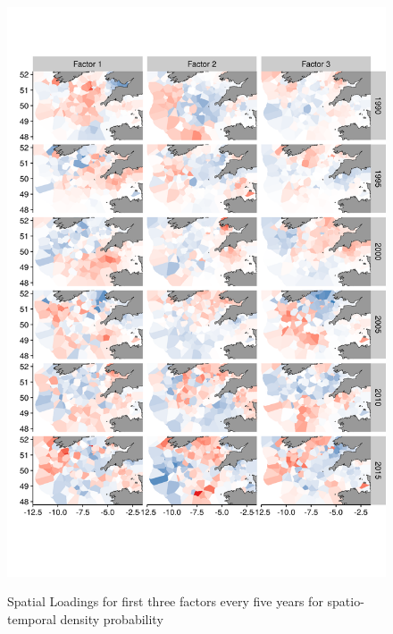 \documentclass{article}
\begin{document}
\begin{figure}
\begin{center}
	\includegraphics[width = 0.8\linewidth]{"figures/Suppl - SpatioTempLoadingsEpsilon2"}
	\label{fig:S6}
	\caption{Spatial Loadings for first three factors every five years for
	spatio-temporal density probability}
	\end{center}
\end{figure}
\end{document}
